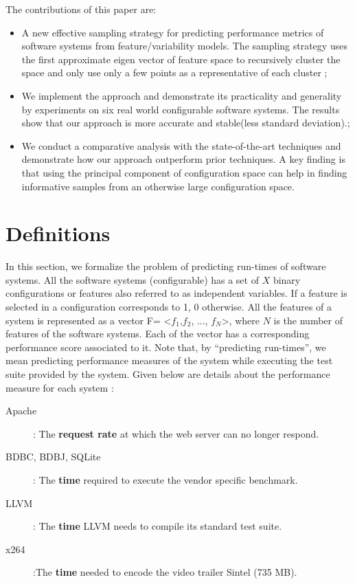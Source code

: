 \documentclass{sig-alternative}
\newcommand{\bi}{\begin{itemize}}%
\newcommand{\ei}{\end{itemize}}
\begin{document}
The contributions of this paper are:
\bi
\item A new effective sampling strategy for predicting performance metrics of software systems from feature/variability models. The sampling strategy uses the first approximate eigen vector of feature space to recursively cluster the space and only use only a few points as a representative of each cluster ;
\item We implement the approach and demonstrate its practicality and generality by experiments on six real world configurable software systems. The results show that our approach is more accurate and stable(less standard deviation).;
\item We conduct a comparative analysis with the state-of-the-art techniques and demonstrate how our approach outperform prior techniques. A key finding is that using the principal component of configuration space can help in finding informative samples from an otherwise large configuration space.
\ei


\section{Definitions}

In this section, we formalize the problem of predicting run-times of software systems. All the software systems (configurable) has a set of $X$ binary configurations or features also referred to as independent  variables. If a feature is selected in a configuration corresponds to 1, 0 otherwise. All the features of a system is represented as a vector F= <$f_1$,$f_2$, ..., $f_N$>, where $N$ is the number of features of the software systems. Each of the vector has a corresponding performance score associated to it.
Note that, by   ``predicting run-times'', we 
mean predicting performance measures of the system while executing the test suite provided by the system. Given below are details about the performance measure for each system \cite{siegmund2012predicting}:
\begin{description}
\item[Apache]: The \textbf{request rate} at which the web server can no longer respond.
\item[BDBC, BDBJ, SQLite]: The \textbf{time} required to execute the vendor specific benchmark. 
\item[LLVM]: The \textbf{time} LLVM needs to compile its standard test suite. 
\item[x264]:The \textbf{time} needed to encode the video trailer Sintel (735 MB). 
\end{description}
\end{document}
